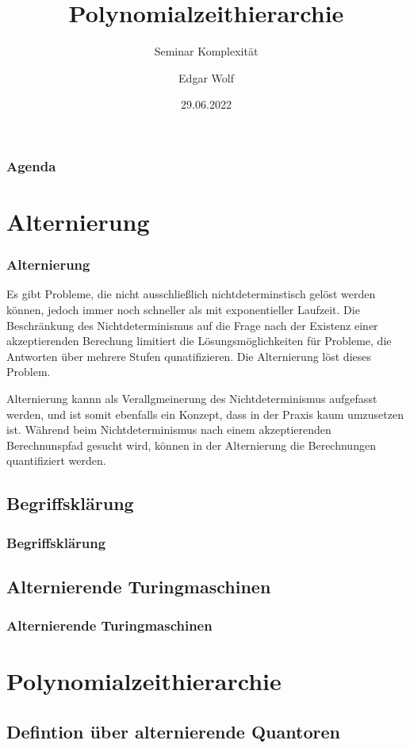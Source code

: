 \documentclass{beamer}
\title{Polynomialzeithierarchie}
\subtitle{Seminar Komplexität}
\author{Edgar Wolf}
\institute{Hochschule Kempten}
\date{29.06.2022}
\begin{document}
\begin{frame}
    \titlepage
\end{frame}

\begin{frame}
    \frametitle{Agenda}
    \tableofcontents
\end{frame}

\section{Alternierung}

\begin{frame}
    \frametitle{Alternierung}
    Es gibt Probleme, die nicht ausschließlich nichtdeterminstisch gelöst werden können, jedoch immer noch schneller als mit exponentieller Laufzeit.
    Die Beschränkung des Nichtdeterminismus auf die Frage nach der Existenz einer akzeptierenden Berechung limitiert die Lösungsmöglichkeiten für Probleme,
    die Antworten über mehrere Stufen qunatifizieren. Die Alternierung löst dieses Problem.
\end{frame}

\begin{frame}
    Alternierung kannn als Verallgmeinerung des Nichtdeterminismus aufgefasst werden, und ist somit ebenfalls ein Konzept, dass in der Praxis kaum umzusetzen ist.
    Während beim Nichtdeterminismus nach einem akzeptierenden Berechnunspfad gesucht wird, können in der Alternierung die Berechnungen quantifiziert werden.
\end{frame}

\subsection{Begriffsklärung}
\begin{frame}
    \frametitle{Begriffsklärung}
\end{frame}

\subsection{Alternierende Turingmaschinen}
\begin{frame}
    \frametitle{Alternierende Turingmaschinen}
\end{frame}


\section{Polynomialzeithierarchie}
\subsection{Defintion über alternierende Quantoren}
\end{document}
